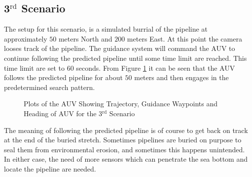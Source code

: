 	\subsection{3$^{\mathrm{rd}}$ Scenario}
		The setup for this scenario, is a simulated burrial of the pipeline at approximately $50$
		meters North and $200$ meters East. At this point the camera looses track of the pipeline. The
		guidance system will command the AUV to continue following the predicted pipeline until some
		time limit are reached. This time limit are set to $60$ seconds. From Figure
		\ref{fig:ch3_3rd_NE_plots} it can be seen that the AUV follows the predicted pipeline for
		about $50$ meters and then engages in the predetermined search pattern.
		\begin{figure}[htbp]
			\centering
			\caption[Trajectory plots from the 3rd scenario]{Plots of the AUV Showing Trajectory, 
			Guidance Waypoints and Heading of AUV for the 3$^{\mathrm{rd}}$ Scenario}
			\label{fig:ch3_3rd_NE_plots}
		\end{figure}
		
		The meaning of following the predicted pipeline is of course to get back on track at the end
of
		the buried stretch. Sometimes pipelines are buried on purpose to seal them from environmental
		erosion, and sometimes this happens unintended. In
		either case, the need of more sensors which can penetrate the sea bottom and locate the
		pipeline are needed. 


